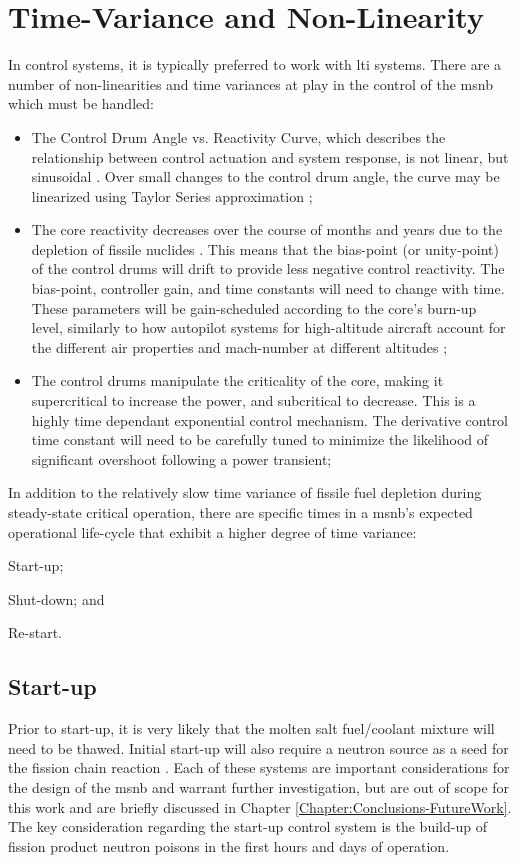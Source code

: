 \section{Time-Variance and Non-Linearity}
In control systems, it is typically preferred to work with \acf{lti} systems. There are a number of non-linearities and time variances at play in the control of the \acs{msnb} which must be handled:

\begin{itemize}
    \item The Control Drum Angle vs. Reactivity Curve, which describes the relationship between control actuation and system response, is not linear, but sinusoidal \cite{PetersonMS}. Over small changes to the control drum angle, the curve may be linearized using Taylor Series approximation \cite[Ch. 2]{Bequette};
    \item The core reactivity decreases over the course of months and years due to the depletion of fissile nuclides \cite[Ch. 7]{Lamarsh}. This means that the bias-point (or unity-point) of the control drums will drift to provide less negative control reactivity. The bias-point, controller gain, and time constants will need to change with time. These parameters will be gain-scheduled according to the core's burn-up level, similarly to how autopilot systems for high-altitude aircraft account for the different air properties and mach-number at different altitudes \cite{GainSchedule};
    \item The control drums manipulate the criticality of the core, making it supercritical to increase the power, and subcritical to decrease. This is a highly time dependant exponential control mechanism. The derivative control time constant will need to be carefully tuned to minimize the likelihood of significant overshoot following a power transient; 
\end{itemize}


In addition to the relatively slow time variance of fissile fuel depletion during steady-state critical operation, there are specific times in a \acs{msnb}'s expected operational life-cycle that exhibit a higher degree of time variance: 
\begin{enumerate*}
\item Start-up; \item Shut-down; and \item Re-start.
\end{enumerate*}

\subsection{Start-up}
Prior to start-up, it is very likely that the molten salt fuel/coolant mixture will need to be thawed. Initial start-up will also require a neutron source as a seed for the fission chain reaction \cite[Ch. 2]{DH}. Each of these systems are important considerations for the design of the \acs{msnb} and warrant further investigation, but are out of scope for this work and are briefly discussed in Chapter \ref{Chapter:Conclusions-FutureWork}. The key consideration regarding the start-up control system is the build-up of fission product neutron poisons in the first hours and days of operation.

